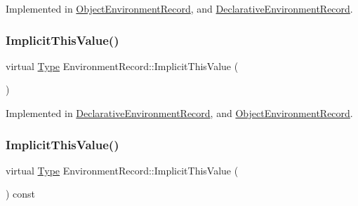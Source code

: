Implemented in \hyperlink{struct_object_environment_record_a88d20bcdf70ed4b5f5a837b99e26a963}{Object\+Environment\+Record}, and \hyperlink{struct_declarative_environment_record_a76b1f7c3be69f63d9711e256b81738d5}{Declarative\+Environment\+Record}.

\mbox{\label{struct_environment_record_acef5c0dac3d58cbef25daa495c5d0e00}} 
\subsubsection{\texorpdfstring{Implicit\+This\+Value()}{ImplicitThisValue()}\hspace{0.1cm}{\footnotesize\ttfamily [1/2]}}
{\footnotesize\ttfamily virtual \hyperlink{class_type}{Type} Environment\+Record\+::\+Implicit\+This\+Value (\begin{DoxyParamCaption}{ }\end{DoxyParamCaption})\hspace{0.3cm}{\ttfamily [pure virtual]}}



Implemented in \hyperlink{struct_declarative_environment_record_a0e5b27bb35773d4dbf994384265de1c8}{Declarative\+Environment\+Record}, and \hyperlink{struct_object_environment_record_a8b10ec38bc18347950dffdfb4d34a634}{Object\+Environment\+Record}.

\mbox{\label{struct_environment_record_a9c60c0ab4900f6a8cdc50ceefdbf0507}} 
\subsubsection{\texorpdfstring{Implicit\+This\+Value()}{ImplicitThisValue()}\hspace{0.1cm}{\footnotesize\ttfamily [2/2]}}
{\footnotesize\ttfamily virtual \hyperlink{class_type}{Type} Environment\+Record\+::\+Implicit\+This\+Value (\begin{DoxyParamCaption}{ }\end{DoxyParamCaption}) const\hspace{0.3cm}{\ttfamily [pure virtual]}}



